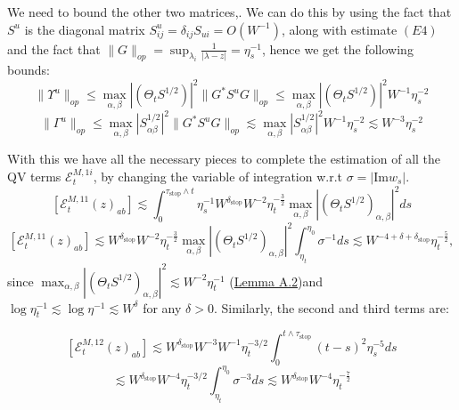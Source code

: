 \documentclass[11pt]{article}
\newcommand{\sto}{\text{stop}}
\begin{document}
\noindent We need to bound the other two matrices,. We can do this by using the fact that $S^u$ is the diagonal matrix $S^u_{ij} = \delta_{ij}S_{ui} = O(W^{-1})$, along with estimate $(E4)$ and the fact that $\|G\|_{op} = \sup_{\lambda_i}\frac{1}{|\lambda -z|}  = \eta_s^{-1}$,
hence we get the following bounds:
$$\|\Upsilon^u\|_{op}\leq \max_{\alpha, \beta}|(\Theta_t S^{1/2})|^2\|G^* S^u G\|_{op}\leq \max_{\alpha, \beta}|(\Theta_t S^{1/2})|^2 W^{-1}\eta_s^{-2}$$
$$\|\Gamma^u\|_{op}\leq\max_{\alpha,\beta}|S_{\alpha\beta}^{1/2}|^2\|G^* S^u G\|_{op}\lesssim \max_{\alpha,\beta}|S_{\alpha\beta}^{1/2}|^2 W^{-1}\eta_s^{-2}\lesssim W^{-3}\eta_s^{-2}$$

\noindent With this we have all the necessary pieces to complete the estimation of all the QV terms $\mathcal{E}^{M, 1i}_t$, by changing the variable of integration w.r.t $\sigma = |\text{Im}w_s|$.
$$\left[\mathcal{E}_{t}^{M, 11}(z)_{ab}\right]\lesssim \int_0^{\tau_\sto\wedge t} \eta_s^{-1} W^{\delta_\sto}W^{-2}\eta_t^{-\frac{3}{2}}\max_{\alpha, \beta}|(\Theta_t S^{1/2})_{\alpha, \beta}|^2ds$$
$$\left[\mathcal{E}_{t}^{M, 11}(z)_{ab}\right]\lesssim W^{\delta_\sto}W^{-2}\eta_t^{-\frac{3}{2}} \max_{\alpha, \beta}|(\Theta_t S^{1/2})_{\alpha, \beta}|^2 \int_{\eta_t}^{\eta_0} \sigma^{-1}ds\lesssim W^{-4+\delta+\delta_\sto}\eta_t^{-\frac{5}{2}},$$
since $\max_{\alpha, \beta}|(\Theta_t S^{1/2})_{\alpha, \beta}|^2 \lesssim W^{-2}\eta_t^{-1}$ (\hyperref[lemma-a2]{Lemma A.2})and $\log \eta_t^{-1}\lesssim \log \eta^{-1}\lesssim W^{\delta}$ for any $\delta>0$. Similarly, the second and third terms are: 

$$\left[\mathcal{E}_{t}^{M, 12}(z)_{ab}\right] \lesssim  W^{\delta_\sto} W^{-3}W^{-1}\eta_t^{-3/2}\int_0^{t\wedge \tau_\sto}(t-s)^2\eta_s^{-5}ds$$
$$\lesssim W^{\delta_\sto}W^{-4}\eta_t^{-3/2}\int_{\eta_t}^{\eta_0}\sigma^{-3}ds\lesssim W^{\delta_\sto} W^{-4}\eta_t^{-\frac{7}{2}}$$
\end{document}
